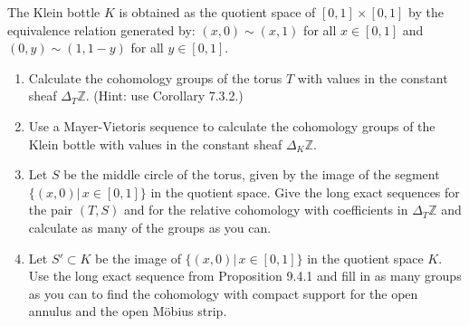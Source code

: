 \documentclass{article}
\newcommand{\zed}{\mathbb Z}
\begin{document}
\begin{enumerate}
The Klein bottle $K$ is obtained as the quotient space of $[0,1]\times[0,1]$ by the equivalence relation generated by: 
$(x,0)\sim (x,1)$ for all $x\in [0,1]$ and $(0,y)\sim(1,1-y)$ for all $y\in [0,1]$.
\begin{enumerate}
\item
Calculate the cohomology groups of the torus $T$ with values in the constant sheaf $\Delta_T\zed$. (Hint: use Corollary 7.3.2.)
\item
Use a Mayer-Vietoris sequence to calculate the cohomology groups of the Klein bottle with values in the constant sheaf $\Delta_K\zed$. 
\item
Let $S$ be the middle circle of the torus, given by the image of the segment $\{(x,0)|\,x\in[0,1]\}$ in the quotient space. Give the long exact sequences for the pair $(T,S)$ 
and for the relative cohomology with coefficients in $\Delta_T\zed$ and calculate as many of the groups as you can.
\item
Let $S'\subset K$ be the image of $\{(x,0)|\,x\in[0,1]\}$ in the quotient space $K$.
Use the long exact sequence from Proposition 9.4.1 and fill in as many groups as you can to find the cohomology with compact support for 
the open annulus and the open M\"obius strip.
\end{enumerate}


\end{enumerate}
\end{document}
